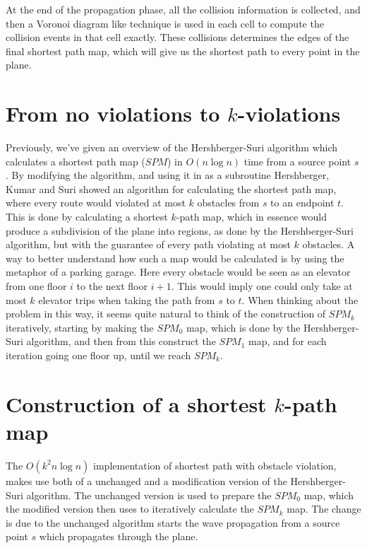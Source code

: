 At the end of the propagation phase, all the collision information is collected, and 
then a Voronoi diagram like technique is used in each cell to compute the collision 
events in that cell exactly. These collisions determines the edges of the final 
shortest path map, which will give us the shortest path to every point in the plane.

\section{From no violations to $k$-violations}

Previously, we've given an overview of the Hershberger-Suri algorithm which calculates a 
shortest path map ($SPM$) in $O(n\log n)$ time from a source point $s$ 
\cite{HershbergerS99}. By modifying the algorithm, and using it in as a subroutine 
Hershberger, Kumar and Suri showed an algorithm for calculating the shortest path map, 
where every route would violated at most $k$ obstacles from $s$ to an endpoint 
$t$\cite{HershbergerKS17}. This is done by calculating a shortest $k$-path map, which in 
essence would produce a subdivision of the plane into regions, as done by the 
Hershberger-Suri algorithm, but with the guarantee of every path violating at most $k$ 
obstacles. A way to better understand how such a map would be calculated is by using the 
metaphor of a parking garage. Here every obstacle would be seen as an elevator from one 
floor $i$ to the next floor $i+1$. This would imply one could only take at most $k$ 
elevator trips when taking the path from $s$ to $t$. When thinking about the problem in 
this way, it seems quite natural to think of the construction of $SPM_k$ iteratively, 
starting by making the $SPM_0$ map, which is done by the Hershberger-Suri algorithm, and 
then from this construct the $SPM_1$ map, and for each iteration going one floor up, 
until we reach $SPM_{k}$.

\section{Construction of a shortest $k$-path map}

The $O(k^2 n \log n)$ implementation of shortest path with obstacle violation, makes use 
both of a unchanged and a modification version of the Hershberger-Suri algorithm. The 
unchanged version is used to prepare the $SPM_0$ map, which the modified version then 
uses to iteratively calculate the $SPM_k$ map. The change is due to the unchanged 
algorithm starts the wave propagation from a source point $s$ which propagates through 
the plane. 

